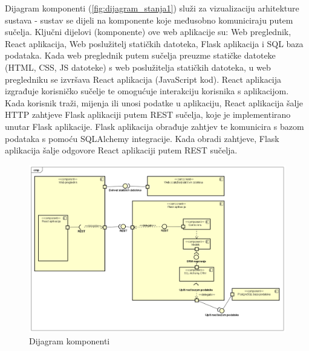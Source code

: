 			 
			 Dijagram komponenti (\ref{fig:dijagram_stanja1}) služi za vizualizaciju arhitekture sustava - sustav se dijeli na komponente koje međusobno komuniciraju putem sučelja. Ključni dijelovi (komponente) ove web aplikacije su: Web preglednik, React aplikacija, Web poslužitelj statičkih datoteka, Flask aplikacija i SQL baza podataka. Kada web preglednik putem sučelja preuzme statičke datoteke (HTML, CSS, JS datoteke) s web poslužitelja statičkih datoteka, u web pregledniku se izvršava React aplikacija (JavaScript kod). React aplikacija izgrađuje korisničko sučelje te omogućuje interakciju korisnika s aplikacijom. Kada korisnik traži, mijenja ili unosi podatke u aplikaciju, React aplikacija šalje HTTP zahtjeve Flask aplikaciji putem REST sučelja, koje je implementirano unutar Flask aplikacije. Flask aplikacija obrađuje zahtjev te komunicira s bazom podataka s pomoću SQLAlchemy integracije. Kada obradi zahtjeve, Flask aplikacija šalje odgovore React aplikaciji putem REST sučelja.
			 \begin{figure}[H]
				\includegraphics[scale=0.3]{slike/Dijagram_komponenti_Aplikacija.PNG} %
				\centering
				\caption{Dijagram komponenti}
				\label{fig:dijagram_komponenti1}
			\end{figure}
			 
			 
			 
			 